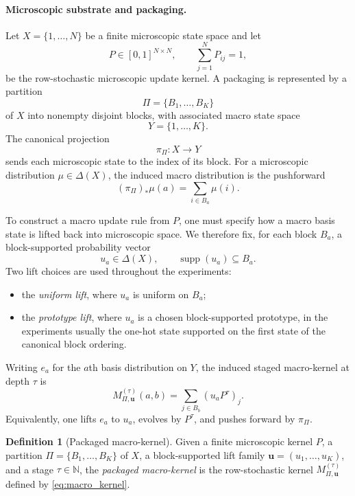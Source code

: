 \documentclass[11pt]{article}
\theoremstyle{definition}
\newtheorem{definition}{Definition}[section]
\begin{document}
\paragraph{Microscopic substrate and packaging.}
Let $X=\{1,\dots,N\}$ be a finite microscopic state space and let
\[
P \in [0,1]^{N\times N},
\qquad
\sum_{j=1}^{N} P_{ij}=1,
\]
be the row-stochastic microscopic update kernel. A packaging is represented by a partition
\[
\Pi=\{B_{1},\dots,B_{K}\}
\]
of $X$ into nonempty disjoint blocks, with associated macro state space
\[
Y=\{1,\dots,K\}.
\]
The canonical projection
\[
\pi_{\Pi}:X\to Y
\]
sends each microscopic state to the index of its block. For a microscopic distribution $\mu \in \Delta(X)$, the induced macro distribution is the pushforward
\[
(\pi_{\Pi})_{*}\mu (a)
=
\sum_{i\in B_{a}} \mu(i).
\]

To construct a macro update rule from $P$, one must specify how a macro basis state is lifted back into microscopic space. We therefore fix, for each block $B_{a}$, a block-supported probability vector
\[
u_{a}\in \Delta(X),
\qquad
\operatorname{supp}(u_{a})\subseteq B_{a}.
\]
Two lift choices are used throughout the experiments:
\begin{itemize}
    \item the \emph{uniform lift}, where $u_{a}$ is uniform on $B_{a}$;
    \item the \emph{prototype lift}, where $u_{a}$ is a chosen block-supported prototype, in the experiments usually the one-hot state supported on the first state of the canonical block ordering.
\end{itemize}
Writing $e_{a}$ for the $a$th basis distribution on $Y$, the induced staged macro-kernel at depth $\tau$ is
\begin{equation}\label{eq:macro_kernel}
M_{\Pi,\mathbf{u}}^{(\tau)}(a,b)
=
\sum_{j\in B_{b}} (u_{a}P^{\tau})_{j}.
\end{equation}
Equivalently, one lifts $e_{a}$ to $u_{a}$, evolves by $P^{\tau}$, and pushes forward by $\pi_{\Pi}$.

\begin{definition}[Packaged macro-kernel]\label{def:packaged_macro_kernel}
Given a finite microscopic kernel $P$, a partition $\Pi=\{B_{1},\dots,B_{K}\}$ of $X$, a block-supported lift family $\mathbf{u}=(u_{1},\dots,u_{K})$, and a stage $\tau\in\mathbb{N}$, the \emph{packaged macro-kernel} is the row-stochastic kernel $M_{\Pi,\mathbf{u}}^{(\tau)}$ defined by \eqref{eq:macro_kernel}.
\end{definition}
\end{document}
